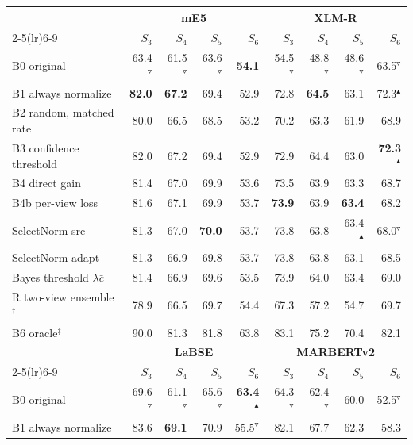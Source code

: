 \begin{tabular}{@{}lrrrrrrrr@{}}\toprule
 & \multicolumn{4}{c}{\textbf{mE5}} & \multicolumn{4}{c}{\textbf{XLM-R}}\\
\cmidrule(lr){2-5}\cmidrule(lr){6-9}
 & $S_3$ & $S_4$ & $S_5$ & $S_6$ & $S_3$ & $S_4$ & $S_5$ & $S_6$\\\midrule
B0 original & 63.4$^{\triangledown}$ & 61.5$^{\triangledown}$ & 63.6$^{\triangledown}$ & \textbf{54.1} & 54.5$^{\triangledown}$ & 48.8$^{\triangledown}$ & 48.6$^{\triangledown}$ & 63.5$^{\triangledown}$\\
B1 always normalize & \textbf{82.0} & \textbf{67.2} & 69.4 & 52.9 & 72.8 & \textbf{64.5} & 63.1 & 72.3$^{\blacktriangle}$\\
B2 random, matched rate & 80.0 & 66.5 & 68.5 & 53.2 & 70.2 & 63.3 & 61.9 & 68.9\\
B3 confidence threshold & 82.0 & 67.2 & 69.4 & 52.9 & 72.9 & 64.4 & 63.0 & \textbf{72.3}$^{\blacktriangle}$\\
B4 direct gain & 81.4 & 67.0 & 69.9 & 53.6 & 73.5 & 63.9 & 63.3 & 68.7\\
B4b per-view loss & 81.6 & 67.1 & 69.9 & 53.7 & \textbf{73.9} & 63.9 & \textbf{63.4} & 68.2\\
SelectNorm-src & 81.3 & 67.0 & \textbf{70.0} & 53.7 & 73.8 & 63.8 & 63.4$^{\blacktriangle}$ & 68.0$^{\triangledown}$\\
\rowcolor{black!6}SelectNorm-adapt & 81.3 & 66.9 & 69.8 & 53.7 & 73.8 & 63.8 & 63.1 & 68.5\\
\quad Bayes threshold $\lambda\bar c$ & 81.4 & 66.9 & 69.6 & 53.5 & 73.9 & 64.0 & 63.4 & 69.0\\
\addlinespace[2pt]
R two-view ensemble$^\dagger$ & 78.9 & 66.5 & 69.7 & 54.4 & 67.3 & 57.2 & 54.7 & 69.7\\
B6 oracle$^\ddagger$ & 90.0 & 81.3 & 81.8 & 63.8 & 83.1 & 75.2 & 70.4 & 82.1\\
\midrule[\heavyrulewidth]
 & \multicolumn{4}{c}{\textbf{LaBSE}} & \multicolumn{4}{c}{\textbf{MARBERTv2}}\\
\cmidrule(lr){2-5}\cmidrule(lr){6-9}
 & $S_3$ & $S_4$ & $S_5$ & $S_6$ & $S_3$ & $S_4$ & $S_5$ & $S_6$\\\midrule
B0 original & 69.6$^{\triangledown}$ & 61.1$^{\triangledown}$ & 65.6$^{\triangledown}$ & \textbf{63.4}$^{\blacktriangle}$ & 64.3$^{\triangledown}$ & 62.4$^{\triangledown}$ & 60.0 & 52.5$^{\triangledown}$\\
B1 always normalize & 83.6 & \textbf{69.1} & 70.9 & 55.5$^{\triangledown}$ & 82.1 & 67.7 & 62.3 & 58.3\\

\end{tabular}
